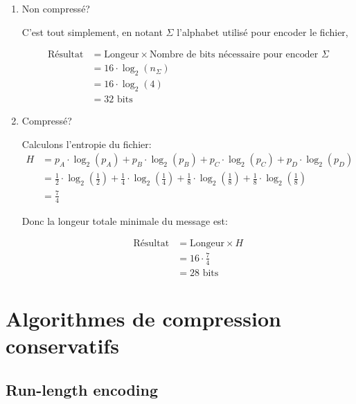 \documentclass[a4paper,11pt]{article}
\newcommand{\ti}{\cdot}
\begin{document}
\begin{enumerate}

\item Non compressé?

  C'est tout simplement, en notant $\Sigma$ l'alphabet utilisé pour encoder le
  fichier,

  \begin{align*}
    \text{Résultat} &= \text{Longeur} \times \text{Nombre de bits nécessaire
                      pour encoder } \Sigma \\
                    &= 16 \ti \log_2(n_{\Sigma}) \\
                    &= 16 \ti \log_2(4) \\
                    &= 32 \text{ bits}
  \end{align*}

\item Compressé?

  Calculons l'entropie du fichier:
  \begin{align*}
    H &= p_A \ti \log_2(p_A) + p_B \ti \log_2(p_B) + p_C \ti \log_2(p_C) + p_D \ti \log_2(p_D) \\
      &= \frac{1}{2} \ti \log_2\left(\frac{1}{2}\right) + \frac{1}{4} \ti \log_2\left(\frac{1}{4}\right) +
        \frac{1}{8} \ti \log_2\left(\frac{1}{8}\right) + \frac{1}{8} \ti \log_2\left(\frac{1}{8}\right) \\
      &= \frac{7}{4}
  \end{align*}

  Donc la longeur totale minimale du message est:

  \begin{align*}
    \text{Résultat} &= \text{Longeur} \times H \\
                    &= 16 \ti \frac{7}{4} \\
                    &= 28 \text{ bits}
  \end{align*}

\end{enumerate}

\section{Algorithmes de compression conservatifs}

\subsection{Run-length encoding}
\end{document}
